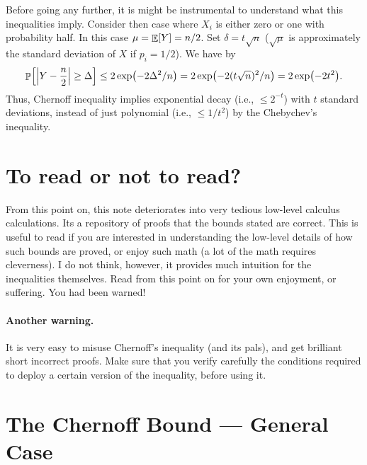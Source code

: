 \begin{remark}
    Before going any further, it is might be instrumental to
    understand what this inequalities imply.  Consider then case where
    $X_i$ is either zero or one with probability half. In this case
    $\mu = \mathop{\mathbb{E}}\!\left[ {Y} \right] = n/2$. Set $\delta = t\sqrt{n}$ ($\sqrt{\mu}$ is
    approximately the standard deviation of $X$ if $p_i = 1/2$).  We
    have by
    \begin{align*}
        \Prob{\cardin{Y - \frac{n}{2}} \geq \Delta } \leq 2\exp
        \pth{-2\Delta^2/n} = 2\exp \pth{-2(t\sqrt{n})^2/n} = 2\exp
        \pth{-2 t^2}.
    \end{align*}
    Thus, Chernoff inequality implies exponential decay (i.e., $\leq
    2^{-t}$) with $t$ standard deviations, instead of just polynomial
    (i.e., $\leq 1/t^2$) by the Chebychev's inequality.
\end{remark}



\section{To read or not to read?}

From this point on, this note deteriorates into very tedious low-level calculus calculations. Its a repository of proofs that the bounds stated are correct. This is useful to read if you are interested in understanding the low-level details of how such bounds are proved, or enjoy such math (a lot of the math requires cleverness). I do not think, however, it provides much intuition for the inequalities themselves. Read from this point on for your own enjoyment, or suffering. You had been warned!

\paragraph*{Another  warning.}

It is very easy to misuse Chernoff's inequality (and its pals), and get brilliant short incorrect proofs. Make sure that you verify carefully the conditions required to deploy a certain version of the inequality, before using it.



\section{The Chernoff Bound --- General Case}



